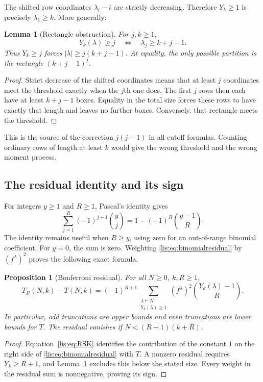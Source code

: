 \documentclass[11pt,letterpaper]{article}
\numberwithin{equation}{section}
\newtheorem{proposition}[theorem]{Proposition}
\newtheorem{lemma}[theorem]{Lemma}
\theoremstyle{definition}
\begin{document}
The shifted row coordinates $\lambda_i-i$ are strictly decreasing.
Therefore $Y_k\ge1$ is precisely $\lambda_1\ge k$. More generally:

\begin{lemma}[Rectangle obstruction]\label{lis:lem:rectangle}
For $j,k\ge1$,
\begin{equation}
 Y_k(\lambda)\ge j
 \quad\Longleftrightarrow\quad
 \lambda_j\ge k+j-1.
 \label{lis:eq:rectangleequiv}
\end{equation}
Thus $Y_k\ge j$ forces $|\lambda|\ge j(k+j-1)$. At equality, the only
possible partition is the rectangle $(k+j-1)^j$.
\end{lemma}
\begin{proof}
Strict decrease of the shifted coordinates means that at least $j$
coordinates meet the threshold exactly when the $j$th one does.
The first $j$ rows then each have at least $k+j-1$ boxes. Equality in
the total size forces these rows to have exactly that length and
leaves no further boxes. Conversely, that rectangle meets the threshold.
\end{proof}

This is the source of the correction $j(j-1)$ in all cutoff formulas.
Counting ordinary rows of length at least $k$ would give the wrong
threshold and the wrong moment process.

\subsection{The residual identity and its sign}
For integers $y\ge1$ and $R\ge1$, Pascal's identity gives
\begin{equation}
 \sum_{j=1}^{R}(-1)^{j+1}\binom yj
 =1-(-1)^R\binom{y-1}{R}.
 \label{lis:eq:binomialresidual}
\end{equation}
The identity remains useful when $R\ge y$, using zero for an
out-of-range binomial coefficient. For $y=0$, the sum is zero.
Weighting \eqref{lis:eq:binomialresidual} by $(f^\lambda)^2$ proves the
following exact formula.

\begin{proposition}[Bonferroni residual]\label{lis:prop:residual}
For all $N\ge0$, $k,R\ge1$,
\begin{equation}
 T_R(N,k)-T(N,k)
 =(-1)^{R+1}
   \sum_{\substack{\lambda\vdash N\\Y_k(\lambda)\ge1}}
       (f^\lambda)^2\binom{Y_k(\lambda)-1}{R}.
 \label{lis:eq:residual}
\end{equation}
In particular, odd truncations are upper bounds and even truncations
are lower bounds for $T$. The residual vanishes if
$N<(R+1)(k+R)$.
\end{proposition}
\begin{proof}
Equation~\eqref{lis:eq:RSK} identifies the contribution of the constant $1$
on the right side of \eqref{lis:eq:binomialresidual} with $T$. A nonzero
residual requires $Y_k\ge R+1$, and Lemma~\ref{lis:lem:rectangle} excludes
this below the stated size. Every weight in the residual sum is
nonnegative, proving its sign.
\end{proof}
\end{document}
